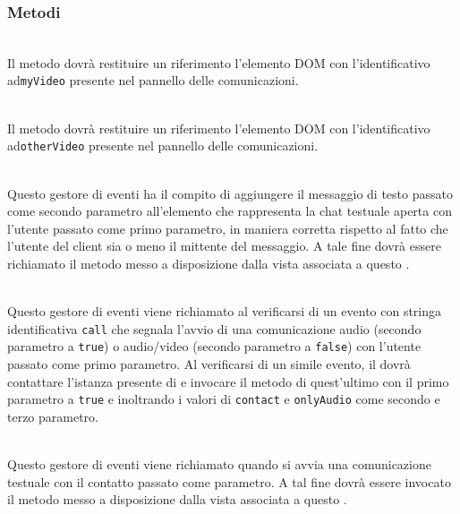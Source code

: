 \subsubsection*{Metodi}
\begin{description}

  \item{}\\
  Il metodo dovrà restituire un riferimento l'elemento DOM con l'identificativo ad\verb'myVideo' presente nel pannello delle comunicazioni.

  \item{}\\
  Il metodo dovrà restituire un riferimento l'elemento DOM con l'identificativo ad\verb'otherVideo' presente nel pannello delle comunicazioni.
  
  \item{}\\
  Questo gestore di eventi ha il compito di aggiungere il messaggio di testo passato come secondo parametro all'elemento che rappresenta la chat testuale aperta con l'utente passato come primo parametro, in maniera corretta rispetto al fatto che l'utente del client sia o meno il mittente del messaggio. A tale fine dovrà essere richiamato il metodo  messo a disposizione dalla vista associata a questo .
  
  \item{}\\
  Questo gestore di eventi viene richiamato al verificarsi di un evento con stringa identificativa \verb'call' che segnala l'avvio di una comunicazione audio (secondo parametro a \verb'true') o audio/video (secondo parametro a \verb'false') con l'utente passato come primo parametro.
  Al verificarsi di un simile evento, il  dovrà contattare l'istanza presente di  e invocare il metodo  di quest'ultimo con il primo parametro a \verb'true' e inoltrando i valori di \verb'contact' e \verb'onlyAudio' come secondo e terzo parametro.
  
  \item{}\\
  Questo gestore di eventi viene richiamato quando si avvia una comunicazione testuale con il contatto passato come parametro. A tal fine dovrà essere invocato il metodo  messo a disposizione dalla vista associata a questo .
  

\end{description}

